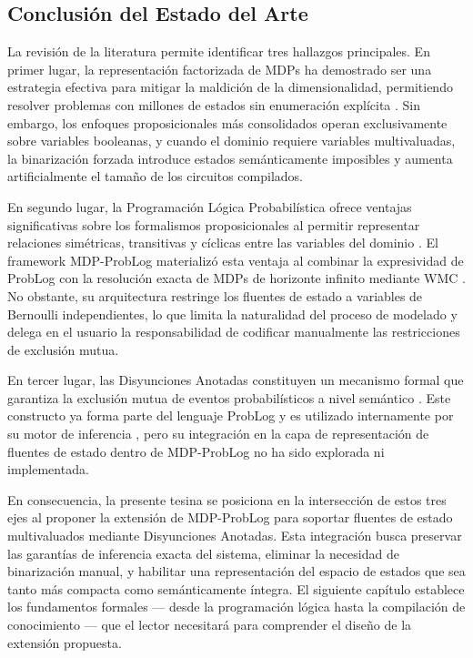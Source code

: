 \subsection{Conclusión del Estado del Arte}
\label{sec:ea-conclusion}

La revisión de la literatura permite identificar tres hallazgos principales. En primer lugar, la representación factorizada de MDPs ha demostrado ser una estrategia efectiva para mitigar la maldición de la dimensionalidad, permitiendo resolver problemas con millones de estados sin enumeración explícita \cite{boutilier2000stochastic, hoey1999spudd}. Sin embargo, los enfoques proposicionales más consolidados operan exclusivamente sobre variables booleanas, y cuando el dominio requiere variables multivaluadas, la binarización forzada introduce estados semánticamente imposibles y aumenta artificialmente el tamaño de los circuitos compilados.

En segundo lugar, la Programación Lógica Probabilística ofrece ventajas significativas sobre los formalismos proposicionales al permitir representar relaciones simétricas, transitivas y cíclicas entre las variables del dominio \cite{bueno2016mdp, deraedt2015probabilistic}. El framework MDP-ProbLog materializó esta ventaja al combinar la expresividad de ProbLog con la resolución exacta de MDPs de horizonte infinito mediante WMC \cite{fierens2015inference}. No obstante, su arquitectura restringe los fluentes de estado a variables de Bernoulli independientes, lo que limita la naturalidad del proceso de modelado y delega en el usuario la responsabilidad de codificar manualmente las restricciones de exclusión mutua.

En tercer lugar, las Disyunciones Anotadas constituyen un mecanismo formal que garantiza la exclusión mutua de eventos probabilísticos a nivel semántico \cite{vennekens2009cplogic, poole1997independent}. Este constructo ya forma parte del lenguaje ProbLog y es utilizado internamente por su motor de inferencia \cite{vlasselaer2016problog2}, pero su integración en la capa de representación de fluentes de estado dentro de MDP-ProbLog no ha sido explorada ni implementada.

En consecuencia, la presente tesina se posiciona en la intersección de estos tres ejes al proponer la extensión de MDP-ProbLog para soportar fluentes de estado multivaluados mediante Disyunciones Anotadas. Esta integración busca preservar las garantías de inferencia exacta del sistema, eliminar la necesidad de binarización manual, y habilitar una representación del espacio de estados que sea tanto más compacta como semánticamente íntegra. El siguiente capítulo establece los fundamentos formales --- desde la programación lógica hasta la compilación de conocimiento --- que el lector necesitará para comprender el diseño de la extensión propuesta.

